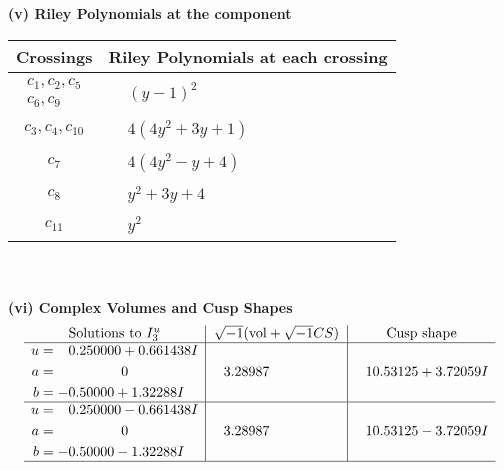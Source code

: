 \documentclass[1p]{elsarticle_modified}
\theoremstyle{definition}
\newcommand{\I}{\sqrt{-1}}
\begin{document}
\newpage\renewcommand{\arraystretch}{1}
\flushleft \textbf{(v) Riley Polynomials at the component}\newline \\
\begin{tabular}{m{50pt}|m{274pt}}
Crossings & \hspace{64pt}Riley Polynomials at each crossing \\
\hline $$\begin{aligned}c_{1},c_{2},c_{5}\\c_{6},c_{9}\end{aligned}$$&$\begin{aligned}
&(y-1)^2
\end{aligned}$\\
\hline $$\begin{aligned}c_{3},c_{4},c_{10}\end{aligned}$$&$\begin{aligned}
&4(4 y^2+3 y+1)
\end{aligned}$\\
\hline $$\begin{aligned}c_{7}\end{aligned}$$&$\begin{aligned}
&4(4 y^2- y+4)
\end{aligned}$\\
\hline $$\begin{aligned}c_{8}\end{aligned}$$&$\begin{aligned}
&y^2+3 y+4
\end{aligned}$\\
\hline $$\begin{aligned}c_{11}\end{aligned}$$&$\begin{aligned}
&y^2
\end{aligned}$\\
\hline
\end{tabular}\\~\\
\newpage\flushleft \textbf{(vi) Complex Volumes and Cusp Shapes}
$$\begin{array}{c|c|c}  
\text{Solutions to }I^u_{3}& \I (\text{vol} + \sqrt{-1}CS) & \text{Cusp shape}\\
 \hline 
\begin{aligned}
u &= \phantom{-}0.250000 + 0.661438 I \\
a &= \phantom{-0.000000 } 0 \\
b &= -0.50000 + 1.32288 I\end{aligned}
 & \phantom{-}3.28987\phantom{ +0.000000I} & \phantom{-}10.53125 + 3.72059 I \\ \hline\begin{aligned}
u &= \phantom{-}0.250000 - 0.661438 I \\
a &= \phantom{-0.000000 } 0 \\
b &= -0.50000 - 1.32288 I\end{aligned}
 & \phantom{-}3.28987\phantom{ +0.000000I} & \phantom{-}10.53125 - 3.72059 I\\
 \hline 
 \end{array}$$\newpage
\end{document}
